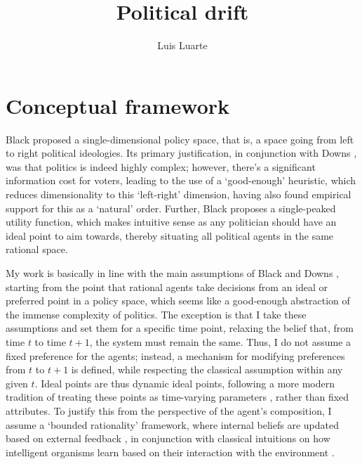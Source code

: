 \documentclass{article}
\begin{document}
	\author{Luis Luarte}
	\title{Political drift}
	\maketitle
	\setlength{\parindent}{0pt}
	\setlength{\parskip}{1em}
	
	\section{Conceptual framework}
	
	Black \cite{black_rationale_1948} proposed a single-dimensional policy space, that is, a space going from left to right political ideologies. Its primary justification, in conjunction with Downs \cite{downs_economic_1957}, was that politics is indeed highly complex; however, there's a significant information cost for voters, leading to the use of a `good-enough' heuristic, which reduces dimensionality to this `left-right' dimension, having also found empirical support for this as a `natural' order. Further, Black \cite{black_rationale_1948} proposes a single-peaked utility function, which makes intuitive sense as any politician should have an ideal point to aim towards, thereby situating all political agents in the same rational space.
	
	My work is basically in line with the main assumptions of Black \cite{black_rationale_1948} and Downs \cite{downs_economic_1957}, starting from the point that rational agents take decisions from an ideal or preferred point in a policy space, which seems like a good-enough abstraction of the immense complexity of politics. The exception is that I take these assumptions and set them for a specific time point, relaxing the belief that, from time $t$ to time $t + 1$, the system must remain the same. Thus, I do not assume a fixed preference for the agents; instead, a mechanism for modifying preferences from $t$ to $t + 1$ is defined, while respecting the classical assumption within any given $t$. Ideal points are thus dynamic ideal points, following a more modern tradition of treating these points as time-varying parameters \cite{martin_dynamic_2002}, rather than fixed attributes. To justify this from the perspective of the agent's composition, I assume a `bounded rationality' framework, where internal beliefs are updated based on external feedback \cite{sargent_bounded_1993}, in conjunction with classical intuitions on how intelligent organisms learn based on their interaction with the environment \cite{sutton_reinforcement_2020}.
	
\end{document}
